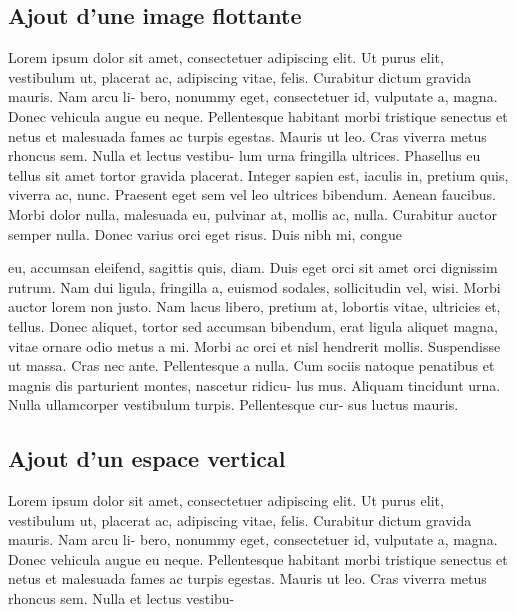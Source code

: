 
\subsection{Ajout d'une image flottante}

Lorem ipsum dolor sit amet, consectetuer adipiscing elit. Ut purus elit, vestibulum
ut, placerat ac, adipiscing vitae, felis. Curabitur dictum gravida mauris. Nam arcu li-
bero, nonummy eget, consectetuer id, vulputate a, magna. Donec vehicula augue eu
neque. Pellentesque habitant morbi tristique senectus et netus et malesuada fames ac
turpis egestas. Mauris ut leo. Cras viverra metus rhoncus sem. Nulla et lectus vestibu-
lum urna fringilla ultrices. Phasellus eu tellus sit amet tortor gravida placerat. Integer
sapien est, iaculis in, pretium quis, viverra ac, nunc. Praesent eget sem vel leo ultrices
bibendum. Aenean faucibus. Morbi dolor nulla, malesuada eu, pulvinar at, mollis ac,
nulla. Curabitur auctor semper nulla. Donec varius orci eget risus. Duis nibh mi, congue


eu, accumsan eleifend, sagittis quis, diam. Duis eget orci sit amet orci dignissim rutrum.
Nam dui ligula, fringilla a, euismod sodales, sollicitudin vel, wisi. Morbi auctor lorem
non justo. Nam lacus libero, pretium at, lobortis vitae, ultricies et, tellus. Donec aliquet,
tortor sed accumsan bibendum, erat ligula aliquet magna, vitae ornare odio metus a mi.
Morbi ac orci et nisl hendrerit mollis. Suspendisse ut massa. Cras nec ante. Pellentesque
a nulla. Cum sociis natoque penatibus et magnis dis parturient montes, nascetur ridicu-
lus mus. Aliquam tincidunt urna. Nulla ullamcorper vestibulum turpis. Pellentesque cur-
sus
luctus
mauris.

\subsection{Ajout d'un espace vertical}

Lorem ipsum dolor sit amet, consectetuer adipiscing elit. Ut purus elit, vestibulum
ut, placerat ac, adipiscing vitae, felis. Curabitur dictum gravida mauris. Nam arcu li- \sn
{}
bero, nonummy eget, consectetuer id, vulputate a, magna. Donec vehicula augue eu
neque. Pellentesque habitant morbi tristique senectus et netus et malesuada fames ac
turpis egestas. Mauris ut leo. Cras viverra metus rhoncus sem. Nulla et lectus vestibu-


